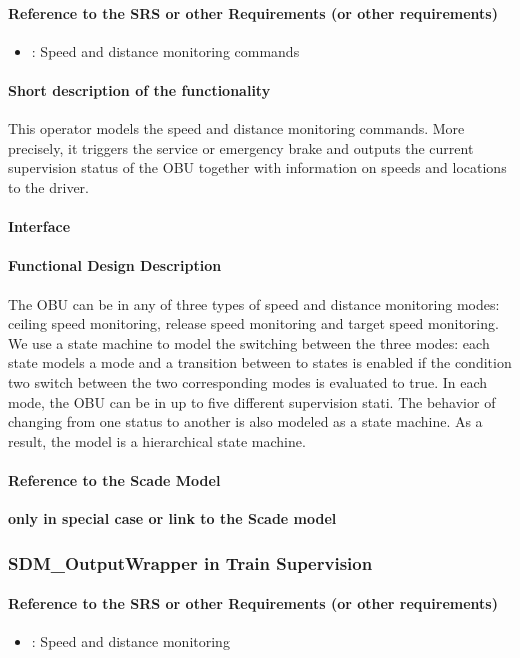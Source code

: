 \paragraph{Reference to the SRS or other Requirements (or other requirements)}
\begin{itemize}
	\item \cite[Chapt.~3.13.10]{subset-026}: Speed and distance monitoring commands 
\end{itemize}
\paragraph{Short description of the functionality}
This operator models the speed and distance monitoring commands. More precisely, it triggers the service or emergency brake and outputs the current supervision status of the OBU together with information on speeds and locations to the driver.
\paragraph{Interface}
\paragraph{Functional Design Description}
The OBU can be in any of three types of speed and distance monitoring modes: ceiling speed monitoring, release speed monitoring and target speed monitoring. We use a state machine to model the switching between the three modes: each state models a mode and a transition between to states is enabled if the condition two switch between the two corresponding modes is evaluated to true. In each mode, the OBU can be in up to five different supervision stati. The behavior of changing from one status to another is also modeled as a state machine. As a result, the model is a hierarchical state machine.
\paragraph{Reference to the Scade Model}
\textbf{only in special case or link to the Scade model}

\subsubsection{SDM\_OutputWrapper in Train Supervision}
\paragraph{Reference to the SRS or other Requirements (or other requirements)}
\begin{itemize}
	\item \cite[Chapt.~3.13]{subset-026}: Speed and distance monitoring 
\end{itemize}

